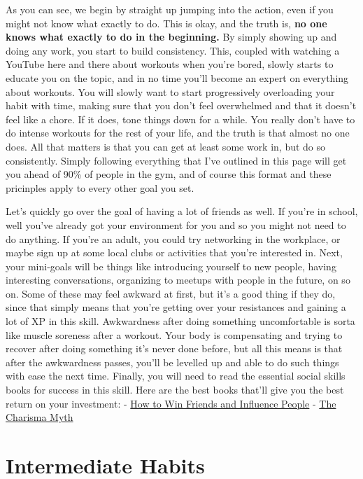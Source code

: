 \documentclass[
]{book}
\begin{document}
As you can see, we begin by straight up jumping into the action, even if you might not know what exactly to do. This is okay, and the truth is, \textbf{no one knows what exactly to do in the beginning.} By simply showing up and doing any work, you start to build consistency. This, coupled with watching a YouTube here and there about workouts when you're bored, slowly starts to educate you on the topic, and in no time you'll become an expert on everything about workouts. You will slowly want to start progressively overloading your habit with time, making sure that you don't feel overwhelmed and that it doesn't feel like a chore. If it does, tone things down for a while. You really don't have to do intense workouts for the rest of your life, and the truth is that almost no one does. All that matters is that you can get at least some work in, but do so consistently. Simply following everything that I've outlined in this page will get you ahead of 90\% of people in the gym, and of course this format and these pricinples apply to every other goal you set.

Let's quickly go over the goal of having a lot of friends as well. If you're in school, well you've already got your environment for you and so you might not need to do anything. If you're an adult, you could try networking in the workplace, or maybe sign up at some local clubs or activities that you're interested in. Next, your mini-goals will be things like introducing yourself to new people, having interesting conversations, organizing to meetups with people in the future, on so on. Some of these may feel awkward at first, but it's a good thing if they do, since that simply means that you're getting over your resistances and gaining a lot of XP in this skill. Awkwardness after doing something uncomfortable is sorta like muscle soreness after a workout. Your body is compensating and trying to recover after doing something it's never done before, but all this means is that after the awkwardness passes, you'll be levelled up and able to do such things with ease the next time. Finally, you will need to read the essential social skills books for success in this skill. Here are the best books that'll give you the best return on your investment:
- \href{https://ia801004.us.archive.org/1/items/HowToWinFriendsAndInfluencePeopleBy/How\%20to\%20Win\%20Friends\%20and\%20Influence\%20People\%20by.pdf}{How to Win Friends and Influence People}
- \href{https://docdro.id/y8ylh73}{The Charisma Myth}

\hypertarget{intermediate-habits}{%
\chapter{Intermediate Habits}\label{intermediate-habits}}
\end{document}
